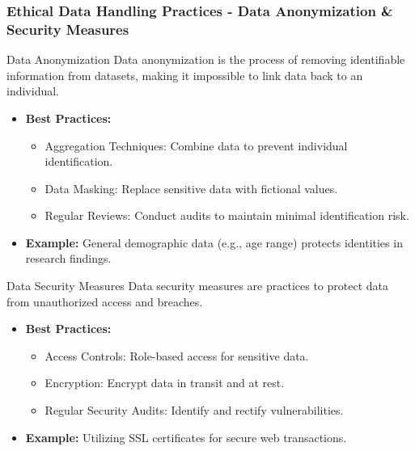\documentclass[aspectratio=169]{beamer}
\begin{document}
\begin{frame}[fragile]
  \frametitle{Ethical Data Handling Practices - Data Anonymization & Security Measures}
  
  \begin{block}{Data Anonymization}
    Data anonymization is the process of removing identifiable information from datasets, making it impossible to link data back to an individual.
  \end{block}
  
  \begin{itemize}
    \item \textbf{Best Practices:}
      \begin{itemize}
        \item Aggregation Techniques: Combine data to prevent individual identification.
        \item Data Masking: Replace sensitive data with fictional values.
        \item Regular Reviews: Conduct audits to maintain minimal identification risk.
      \end{itemize}
    
    \item \textbf{Example:} General demographic data (e.g., age range) protects identities in research findings.
  \end{itemize}
  
  \begin{block}{Data Security Measures}
    Data security measures are practices to protect data from unauthorized access and breaches.
  \end{block}
  
  \begin{itemize}
    \item \textbf{Best Practices:}
      \begin{itemize}
        \item Access Controls: Role-based access for sensitive data.
        \item Encryption: Encrypt data in transit and at rest.
        \item Regular Security Audits: Identify and rectify vulnerabilities.
      \end{itemize}
    
    \item \textbf{Example:} Utilizing SSL certificates for secure web transactions.
  \end{itemize}
\end{frame}
\end{document}
